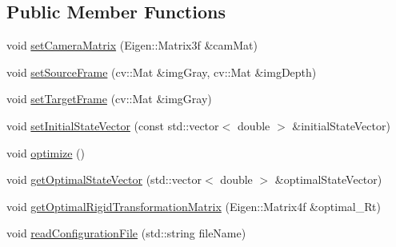 \subsection*{Public Member Functions}
\begin{DoxyCompactItemize}
\item 
void \hyperlink{class_photoconsistency_odometry_1_1_ceres_1_1_c_photoconsistency_odometry_ceres_ad45891d5065f3b00c40c8dbca794a632}{setCameraMatrix} (Eigen::Matrix3f \&camMat)
\item 
void \hyperlink{class_photoconsistency_odometry_1_1_ceres_1_1_c_photoconsistency_odometry_ceres_a987feeea7aab8dcc09ef82bde0814ed7}{setSourceFrame} (cv::Mat \&imgGray, cv::Mat \&imgDepth)
\item 
void \hyperlink{class_photoconsistency_odometry_1_1_ceres_1_1_c_photoconsistency_odometry_ceres_a803aeaed5e74ea8f50bab6694c887aa7}{setTargetFrame} (cv::Mat \&imgGray)
\item 
void \hyperlink{class_photoconsistency_odometry_1_1_ceres_1_1_c_photoconsistency_odometry_ceres_a0993e83c820d16e606bce87edabbcd12}{setInitialStateVector} (const std::vector$<$ double $>$ \&initialStateVector)
\item 
void \hyperlink{class_photoconsistency_odometry_1_1_ceres_1_1_c_photoconsistency_odometry_ceres_af177ce6dd5517d73d5cf25da266a2777}{optimize} ()
\item 
void \hyperlink{class_photoconsistency_odometry_1_1_ceres_1_1_c_photoconsistency_odometry_ceres_a54f00adc07a9027430b4044284dec16c}{getOptimalStateVector} (std::vector$<$ double $>$ \&optimalStateVector)
\item 
void \hyperlink{class_photoconsistency_odometry_1_1_ceres_1_1_c_photoconsistency_odometry_ceres_aef03c06654345aeea7c0e128b575420d}{getOptimalRigidTransformationMatrix} (Eigen::Matrix4f \&optimal\_\-Rt)
\item 
void \hyperlink{class_photoconsistency_odometry_1_1_ceres_1_1_c_photoconsistency_odometry_ceres_a459e59ddd284a1a1a5c239f55dd7fc12}{readConfigurationFile} (std::string fileName)
\end{DoxyCompactItemize}

